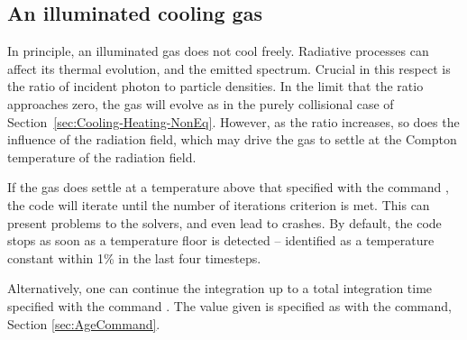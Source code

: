 \begin{shaded}
\section{An illuminated cooling gas}
\label{sec:Cooling-Illum}

In principle, an illuminated gas does not cool freely.
Radiative processes can affect its thermal evolution, and the emitted spectrum.
Crucial in this respect is the ratio of incident photon to particle densities.
In the limit that the ratio approaches zero, the gas will evolve as in the
purely collisional case of Section~\ref{sec:Cooling-Heating-NonEq}.
However, as the ratio increases, so does the influence of the radiation field,
which may drive the gas to settle at the Compton temperature of the radiation
field.

If the gas does settle at a temperature above that specified with the command
, the code will iterate
until the number of iterations criterion is met.
This can present problems to the solvers, and even lead to crashes.
By default, the code stops as soon as a temperature floor is detected
-- identified as a temperature constant within 1\% in the last four timesteps.

Alternatively, one can continue the integration up to a total integration time
specified with the command .
The value given is specified as with the  command, Section
\ref{sec:AgeCommand}.
\end{shaded}


